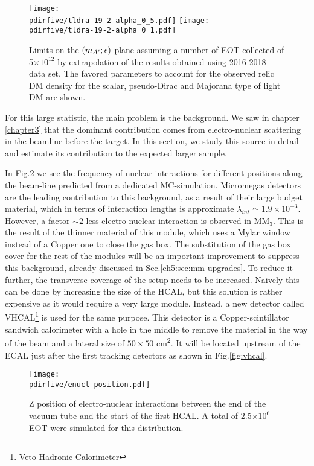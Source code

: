 \begin{figure}[bht!]
  \centering
  \texttt{[image: \\pdirfive/tldra-19-2-alpha\_0\_5.pdf]}
  \texttt{[image: \\pdirfive/tldra-19-2-alpha\_0\_1.pdf]}
  \caption[Sensitivity projection for invisible mode 2021]{Limits on the $(m_{A'};\epsilon)$ plane assuming a number of EOT collected of 5$\times 10^{12}$ by extrapolation of the results obtained using 2016-2018 data set. The favored parameters to account for the observed relic DM density for the scalar, pseudo-Dirac and Majorana type of light DM are shown.}
  \label{fig:dm-sens-proj}
\end{figure}

For this large statistic, the main problem is the background.  We saw in chapter \ref{chapter3} that the dominant contribution comes from electro-nuclear scattering in the beamline before the target. In this section, we study this source in detail and estimate its contribution to the expected larger sample.

In Fig.\ref{fig:enucl-position} we see the frequency of nuclear interactions for different positions along the beam-line predicted from a dedicated MC-simulation. Micromegas detectors are the leading contribution to this background, as a result of their large budget material, which in terms of interaction lengths is approximate $\lambda_{int} \simeq 1.9 \times 10^{-3}$. However, a factor $\sim 2$ less electro-nuclear interaction is observed in MM$_3$. This is the result of the thinner material of this module, which uses a Mylar window instead of a Copper one to close the gas box. The substitution of the gas box cover for the rest of the modules will be an important improvement to suppress this background, already discussed in Sec.\ref{ch5:sec:mm-upgrades}. To reduce it further, the transverse coverage of the setup needs to be increased. Naively this can be done by increasing the size of the HCAL, but this solution is rather expensive as it would require a very large module. Instead, a new detector called VHCAL\footnote{Veto Hadronic Calorimeter} is used for the same purpose. This detector is a Copper-scintillator sandwich calorimeter with a hole in the middle to remove the material in the way of the beam and a lateral size of $50\times50$ \si{\centi\meter\squared}. It will be located upstream of the ECAL just after the first tracking detectors as shown in Fig.\ref{fig:vhcal}.
\begin{figure}[bth!]
  \centering
  \texttt{[image: \\pdirfive/enucl-position.pdf]}
  \caption[electro-nuclear interaction position]{Z position of electro-nuclear interactions between the end of the vacuum tube and the start of the first HCAL. A total of 2.5$\times 10^6$ EOT were simulated for this distribution.}
  \label{fig:enucl-position}
\end{figure}

